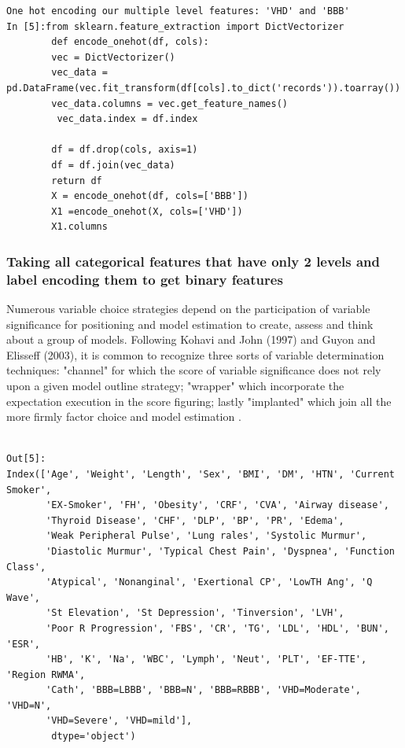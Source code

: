 \documentclass[sigconf]{acmart}
\begin{document}
\begin{lstlisting}
One hot encoding our multiple level features: 'VHD' and 'BBB'
In [5]:from sklearn.feature_extraction import DictVectorizer
        def encode_onehot(df, cols):
        vec = DictVectorizer()
        vec_data = pd.DataFrame(vec.fit_transform(df[cols].to_dict('records')).toarray())
        vec_data.columns = vec.get_feature_names()
         vec_data.index = df.index
    
        df = df.drop(cols, axis=1)
        df = df.join(vec_data)
        return df
        X = encode_onehot(df, cols=['BBB'])
        X1 =encode_onehot(X, cols=['VHD'])
        X1.columns
\end{lstlisting}
\subsubsection{Taking all categorical features that have only 2 levels
and label encoding them to get binary
features}\label{taking-all-categorical-features-that-have-only-2-levels-and-label-encoding-them-to-get-binary-features}
Numerous variable choice strategies depend on the participation of variable significance for positioning and model estimation to create, assess and think about a group of models. Following Kohavi and John (1997) and Guyon and Elisseff (2003), it is common to recognize three sorts of variable determination techniques: "channel" for which the score of variable significance does not rely upon a given model outline strategy; "wrapper" which incorporate the expectation execution in the score figuring; lastly "implanted" which join all the more firmly factor choice and model estimation \cite{GENUER20102225}.


\begin{lstlisting}

Out[5]: 
Index(['Age', 'Weight', 'Length', 'Sex', 'BMI', 'DM', 'HTN', 'Current Smoker',
       'EX-Smoker', 'FH', 'Obesity', 'CRF', 'CVA', 'Airway disease',
       'Thyroid Disease', 'CHF', 'DLP', 'BP', 'PR', 'Edema',
       'Weak Peripheral Pulse', 'Lung rales', 'Systolic Murmur',
       'Diastolic Murmur', 'Typical Chest Pain', 'Dyspnea', 'Function Class',
       'Atypical', 'Nonanginal', 'Exertional CP', 'LowTH Ang', 'Q Wave',
       'St Elevation', 'St Depression', 'Tinversion', 'LVH',
       'Poor R Progression', 'FBS', 'CR', 'TG', 'LDL', 'HDL', 'BUN', 'ESR',
       'HB', 'K', 'Na', 'WBC', 'Lymph', 'Neut', 'PLT', 'EF-TTE', 'Region RWMA',
       'Cath', 'BBB=LBBB', 'BBB=N', 'BBB=RBBB', 'VHD=Moderate', 'VHD=N',
       'VHD=Severe', 'VHD=mild'],
        dtype='object')
\end{lstlisting}
\end{document}
